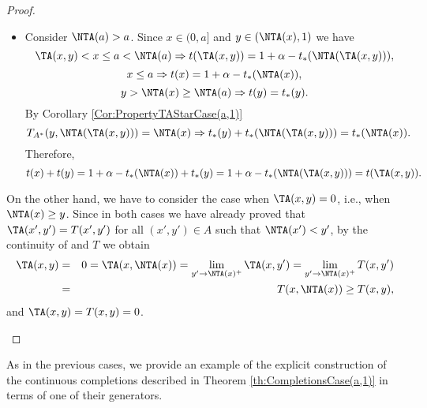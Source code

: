 \begin{proof}
\begin{description}
\begin{itemize}
\begin{itemize}
\begin{itemize}
				\end{itemize}
			\end{itemize}
			\item Consider $\NTA(a) > a$.  Since $x \in (0,a]$ and $y \in (\NTA(x),1)$ we have
			$$\TA(x,y) < x \leq a < \NTA(a) \Rightarrow t(\TA(x,y)) = 1 + \alpha - t_*(\NTA(\TA(x,y))),$$
			$$x \leq a \Rightarrow t(x) = 1 + \alpha - t_*(\NTA(x)),$$
			$$y > \NTA(x) \geq  \NTA(a) \Rightarrow t(y)=t_*(y).$$
			By Corollary \ref{Cor:PropertyTAStarCase(a,1)}
			$$T_{A^*}(y,\NTA(\TA(x,y)))=\NTA(x) \Rightarrow t_*(y) + t_*(\NTA(\TA(x,y)))= t_*(\NTA(x)).$$
			Therefore,
			$$t(x) + t(y) = 1 + \alpha - t_*(\NTA(x)) + t_*(y) = 1 + \alpha -t_*(\NTA(\TA(x,y))) = t(\TA(x,y)).$$
		\end{itemize}
	On the other hand, we have to consider the case when $\TA(x,y)=0$, i.e., when $\NTA(x) \geq y$. Since in both cases we have already proved that $\TA(x',y')=T(x',y')$ for all $(x',y') \in A$ such that $\NTA(x')<y'$, by the continuity of \TA and $T$ we obtain
	\begin{eqnarray*}
		\TA(x,y) &=& 0 = \TA(x,\NTA(x)) = \lim_{y' \to \NTA(x)^+}\TA(x,y') = \lim_{y' \to \NTA(x)^+}T(x,y')\\
		& = & T(x,\NTA(x))\geq T(x,y),
	\end{eqnarray*}
	and $\TA(x,y)=T(x,y)=0$.
	\end{description}
\end{proof}
As in the previous cases, we provide an example of the explicit construction of the continuous completions described in Theorem \ref{th:CompletionsCase(a,1)} in terms of one of their generators.
